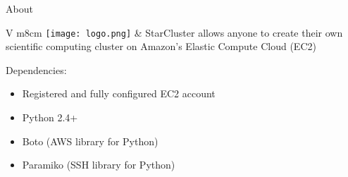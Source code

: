 \begin{frame}{About}
	\begin{tabular}{ V m{8cm} }
	\centering
	\texttt{[image: logo.png]} & StarCluster allows anyone to create their own scientific computing cluster on Amazon's Elastic Compute Cloud (EC2) \\
	\end{tabular}

	\vspace{1cm}

	Dependencies:
	\begin{itemize}
		\item Registered and fully configured EC2 account
		\item Python 2.4+
		\item Boto (AWS library for Python)
		\item Paramiko (SSH library for Python)
	\end{itemize}
\end{frame}

